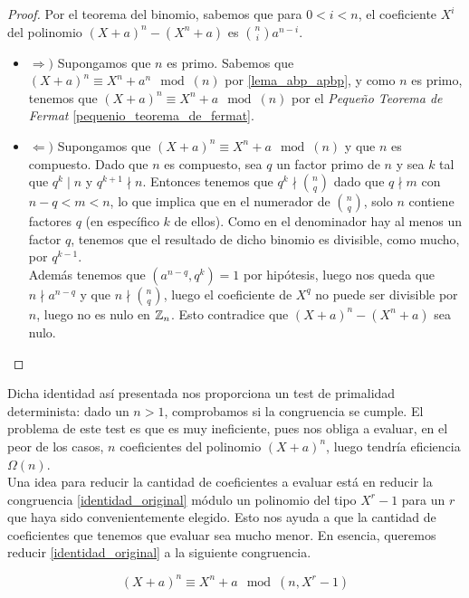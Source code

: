 \begin{proof}
	Por el teorema del binomio, sabemos que para $0 < i < n$, el coeficiente $X^i$ del polinomio $(X + a)^n - (X^n + a)$ es $\binom{n}{i}a^{n-i}$.
	
	\begin{itemize}
		\item $\Rightarrow)$ Supongamos que $n$ es primo. Sabemos que $(X + a)^n \equiv X^n + a^n \mod(n)$ por \autoref{lema_abp_apbp}, y como $n$ es primo,  tenemos que $(X + a)^n \equiv X^n + a \mod(n)$ por el \textit{Pequeño Teorema de Fermat} \ref{pequenio_teorema_de_fermat}.
		
		\item $\Leftarrow)$ Supongamos que $(X + a)^n \equiv X^n + a \mod(n)$ y que $n$ es compuesto. Dado que $n$ es compuesto, sea $q$ un factor primo de $n$ y sea $k$ tal que $q^k \mid n$ y $q^{k+1} \nmid n$. Entonces tenemos que $q^k \nmid \binom{n}{q}$ dado que $q \nmid m$ con $n - q < m < n$, lo que implica que en el numerador de $\binom{n}{q}$, solo $n$ contiene factores $q$ (en específico $k$ de ellos). Como en el denominador hay al menos un factor $q$, tenemos que el resultado de dicho binomio es divisible, como mucho, por $q^{k-1}$.\\
		
		Además tenemos que $(a^{n-q}, q^k) = 1$ por hipótesis, luego nos queda que $n \nmid a^{n-q}$ y que $n \nmid \binom{n}{q}$, luego el coeficiente de $X^q$ no puede ser divisible por $n$, luego no es nulo en $\mathbb{Z}_n$. Esto contradice que $(X + a)^n - (X^n + a)$ sea nulo.
	\end{itemize}
\end{proof}

Dicha identidad así presentada nos proporciona un test de primalidad determinista: dado un $n > 1$, comprobamos si la congruencia se cumple. El problema de este test es que es muy ineficiente, pues nos obliga a evaluar, en el peor de los casos, $n$ coeficientes del polinomio $(X + a)^n$, luego tendría eficiencia $\Omega(n)$.\\

Una idea para reducir la cantidad de coeficientes a evaluar está en reducir la congruencia \eqref{identidad_original} módulo un polinomio del tipo $X^r - 1$ para un $r$ que haya sido convenientemente elegido. Esto nos ayuda a que la cantidad de coeficientes que tenemos que evaluar sea mucho menor. En esencia, queremos reducir \eqref{identidad_original} a la siguiente congruencia.

\begin{equation}\label{identidad_con_polinomio}
(X + a)^n \equiv X^n + a \mod(n, X^r - 1)
\end{equation}

